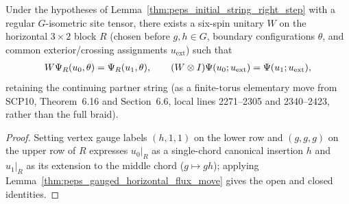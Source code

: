 \begin{lemma}
    \label{thm:peps_initial_string_right_physical_step}
    \leanok
    Under the hypotheses of Lemma~\ref{thm:peps_initial_string_right_step} with a regular $G$-isometric site tensor, there exists a six-spin unitary $W$ on the horizontal $3\times 2$ block $R$ (chosen before $g,h\in G$, boundary configurations $\theta$, and common exterior/crossing assignments $u_{\mathrm{ext}}$) such that
    \begin{align}
        W\Psi_R(u_0,\theta)=\Psi_R(u_1,\theta),\qquad (W\otimes I)\Psi(u_0;u_{\mathrm{ext}})=\Psi(u_1;u_{\mathrm{ext}}), \notag
    \end{align}
    retaining the continuing partner string (as a finite-torus elementary move from SCP10, Theorem~6.16 and Section~6.6, local lines 2271--2305 and 2340--2423, rather than the full braid).
\end{lemma}
\begin{proof}\leanok
    Setting vertex gauge labels $(h,1,1)$ on the lower row and $(g,g,g)$ on the upper row of $R$ expresses $u_0|_R$ as a single-chord canonical insertion $h$ and $u_1|_R$ as its extension to the middle chord ($g\mapsto gh$); applying Lemma~\ref{thm:peps_gauged_horizontal_flux_move} gives the open and closed identities.
\end{proof}
